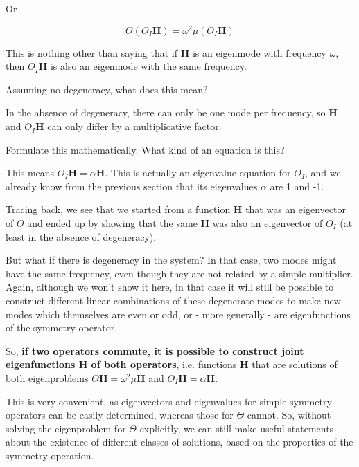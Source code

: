 Or

\begin{equation}
\Theta \left(O_I {\mathbf H} \right) =  \omega^2 \mu \left(O_I {\mathbf H}\right)
\end{equation} 

This is nothing other than saying that if ${\mathbf H}$ is an eigenmode with frequency $\omega$, then $O_I {\mathbf H}$ is also an eigenmode with the same frequency.

\begin{cue}
Assuming no degeneracy, what does this mean?
\end{cue}

In the absence of degeneracy, there can only be one mode per frequency, so ${\mathbf H}$ and $O_I {\mathbf H}$ can only differ by a multiplicative factor.

\begin{cue}
Formulate this mathematically. What kind of an equation is this?
\end{cue}

This means $O_I {\mathbf H} = \alpha {\mathbf H}$. This is actually an eigenvalue equation for $O_I$, and we already know from the previous section that its eigenvalues $\alpha$ are 1 and -1. 

Tracing back, we see that we started from a function ${\mathbf H}$ that was an eigenvector of $\Theta$ and ended up by showing that the same ${\mathbf H}$ was also an eigenvector of $O_I$ (at least in the absence of degeneracy). 

But what if there is degeneracy in the system? In that case, two modes might have the same frequency, even though they are not related by a simple multiplier. Again, although we won't show it here, in that case it will still be possible to construct different linear combinations of these degenerate modes to make new modes which themselves are even or odd, or - more generally - are eigenfunctions of the symmetry operator.

So, \textbf{if two operators commute, it is possible to construct joint eigenfunctions ${\mathbf H}$ of both operators}, i.e. functions ${\mathbf H}$ that are solutions of both eigenproblems $\Theta {\mathbf H} = \omega^2 \mu {\mathbf H}$ and $O_I {\mathbf H} = \alpha {\mathbf H}$.

This is very convenient, as eigenvectors and eigenvalues for simple symmetry operators can be easily determined, whereas those for $\Theta$ cannot. So, without solving the eigenproblem for $\Theta$ explicitly, we can still make useful statements about the existence of different classes of solutions, based on the properties of the symmetry operation.

